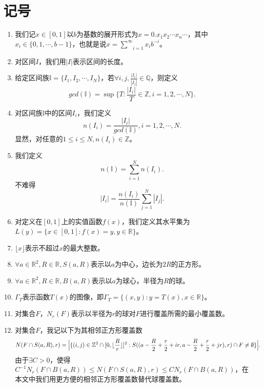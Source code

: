 \cleardoublepage

\section{记号}

\begin{enumerate}
      \item 我们记$x\in[0,1]$以$b$为基数的展开形式为$x=0.x_1x_2\cdots x_n\cdots$，其中$x_i\in\{0,1,\cdots,b-1\}$，也就是说$x=\underset{i=1}{\overset{\infty}{\sum}}x_ib^{-i}$。
      \item 对区间$I$，我们用$|I|$表示区间的长度。
      \item 给定区间族$\mathbb{I}=\{I_1,I_2,\cdots,I_N\}$，若$\forall i,j,\frac{|I_i|}{|I_j|}\in\mathbb{Q}$，则定义
      $$
            gcd(\mathbb{I})=\sup\{T:\frac{|I_i|}{T}\in\mathbb{Z},i=1,2,\cdots,N\}.
      $$
      \item 对区间族$\mathbb{I}$中的区间$I_i$，我们定义
      $$
            n(I_i)=\frac{|I_i|}{gcd(\mathbb{I})},i=1,2,\cdots,N.
      $$
      显然，对任意的$1\le i\le N,n(I_i)\in\mathbb{Z}$。
      \item 我们定义
      $$
            n(\mathbb{I})=\sum_{i=1}^Nn(I_i).
      $$
      不难得
      $$
            |I_i|=\frac{n(I_i)}{n(\mathbb{I})}\sum_{j=1}^N|I_j|.
      $$
      \item 对定义在$[0,1]$上的实值函数$f(x)$，我们定义其水平集为$L(y)=\{x\in[0,1]:f(x)=y,y\in\mathbb{R}\}$。
      \item $\lfloor x \rfloor$表示不超过$x$的最大整数。
      \item $\forall a\in\mathbb{R}^2,R\in\mathbb{R},S(a,R)$表示以$a$为中心，边长为$2R$的正方形。
      \item $\forall a\in\mathbb{R}^2,R\in\mathbb{R},B(a,R)$表示以$a$为球心，半径为$R$的球。
      \item $\Gamma_T$表示函数$T(x)$的图像，即$\Gamma_T=\{(x,y):y=T(x),x\in\mathbb{R}\}$。
      \item 对集合$F$，$N_r(F)$表示以半径为$r$的球对$F$进行覆盖所需的最小覆盖数。
      \item 对集合$F$，我记以下为其相邻正方形覆盖数
      $$
            N(F\cap S(a,R),r)=\Big|\{(i,j)\in\mathbb{Z}^2\cap[0,\lfloor\frac{R}{r}\rfloor]^2:\\
                  S((a-\frac{R}{2}+\frac{r}{2}+ir,a-\frac{R}{2}+\frac{r}{2}+jr),r)\cap F\neq\emptyset\}\Big|.
      $$
      由于$\exists C>0$，使得$C^{-1}N_r(F\cap B(a,R))\le N(F\cap S(a,R),r)\le CN_r(F\cap B(a,R))$，在本文中我们用更方便的相邻正方形覆盖数替代球覆盖数。
\end{enumerate}

